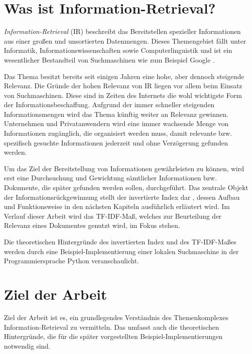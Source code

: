 \section{Was ist Information-Retrieval?}
\textit{Information-Retrieval} (IR) beschreibt das Bereitstellen spezieller Informationen aus einer großen und unsortierten Datenmengen. Dieses Themengebiet fällt unter Informatik, Informationswissenschaften sowie Computerlinguistik und ist ein wesentlicher Bestandteil von Suchmaschinen wie zum Beispiel Google \cite{ir_wiki}.

Das Thema besitzt bereits seit einigen Jahren eine hohe, aber dennoch steigende Relevanz. Die Gründe der hohen Relevanz von IR liegen vor allem beim Einsatz von Suchmaschinen. Diese sind in Zeiten des Internets die wohl wichtigste Form der Informationsbeschaffung. Aufgrund der immer schneller steigenden Informationsmengen wird das Thema künftig weiter an Relevanz gewinnen. Unternehmen und Privatanwendern wird eine immer wachsende Menge von Informationen zugänglich, die organisiert werden muss, damit relevante bzw. spezifisch gesuchte Informationen jederzeit und ohne Verzögerung gefunden werden.

Um das Ziel der Bereitstellung von Informationen gewährleisten zu können, wird erst eine Durchsuchung und Gewichtung sämtlicher Informationen bzw. Dokumente, die später gefunden werden sollen, durchgeführt. Das zentrale Objekt der Informationsrückgewinnung stellt der invertierte Index dar \cite[S. 6]{IR_Intro_Cambridge}, dessen Aufbau und Funktionsweise in den nächsten Kapiteln ausführlich erläutert wird. Im Verlauf dieser Arbeit wird das TF-IDF-Maß, welches zur Beurteilung der Relevanz eines Dokumentes genutzt wird, im Fokus stehen.

Die theoretischen Hintergründe des invertierten Index und des TF-IDF-Maßes werden durch eine Beispiel-Implementierung einer lokalen Suchmaschine in der Programmiersprache Python veranschaulicht.

\section{Ziel der Arbeit}
Ziel der Arbeit ist es, ein grundlegendes Verständnis des Themenkomplexes Information-Retrieval zu vermitteln. Das umfasst auch die theoretischen Hintergründe, die für die später vorgestellten Beispiel-Implementierungen notwendig sind.

